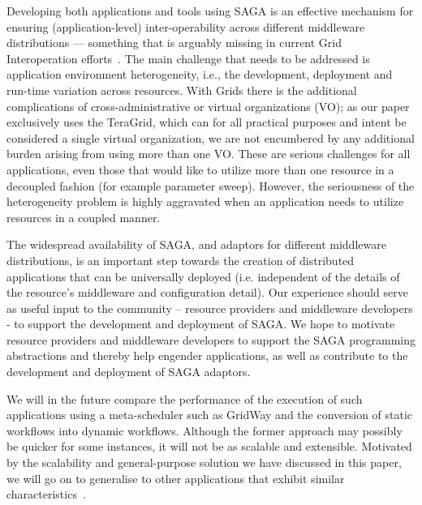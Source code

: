\documentclass[conference,final]{IEEEtran}
\begin{document}
Developing both applications and tools using SAGA is an effective
mechanism for ensuring (application-level) inter-operability across
different middleware distributions --- something that is arguably
missing in current Grid Interoperation efforts~\cite{gin_paper}. The
main challenge that needs to be addressed is application environment
heterogeneity, i.e., the development, deployment and run-time
variation across resources.  With Grids there is the additional
complications of cross-administrative or virtual organizations (VO);
as our paper exclusively uses the TeraGrid, which can for all
practical purposes and intent be considered a single virtual
organization, we are not encumbered by any additional burden arising
from using more than one VO.  These are serious challenges for all
applications, even those that would like to utilize more than one
resource in a decoupled fashion (for example parameter sweep).
However, the seriousness of the heterogeneity problem is highly
aggravated when an application needs to utilize resources in a coupled
manner.

The widespread availability of SAGA, and adaptors for different
middleware distributions, is an important step towards the creation of
distributed applications that can be universally deployed (i.e.
independent of the details of the resource's middleware and
configuration detail).  Our experience should serve as useful input to
the community -- resource providers and middleware developers - to
support the development and deployment of SAGA.  We hope to motivate
resource providers and middleware developers to support the SAGA
programming abstractions and thereby help engender applications, as
well as contribute to the development and deployment of SAGA adaptors.

We will in the future compare the performance of the execution of such
applications using a meta-scheduler such as GridWay and the conversion
of static workflows into dynamic workflows. Although the former
approach may possibly be quicker for some instances, it will not be as
scalable and extensible. Motivated by the scalability and
general-purpose solution we have discussed in this paper, we will go
on to generalise to other applications that exhibit similar
characteristics~\cite{nature99}.


\end{document}
